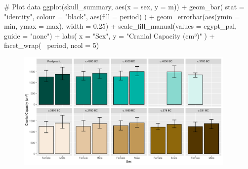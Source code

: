 \begin{inRhigh}[highlightlines={14}]
# Plot data
ggplot(skull_summary, aes(x = sex, y = m)) +
  geom_bar(
    stat = "identity",
    colour = "black",
    aes(fill = period)
  ) +
  geom_errorbar(aes(ymin = min, ymax = max), width = 0.25) +
  scale_fill_manual(values = egypt_pal, guide = "none") +
  labs(
    x = "Sex",
    y = "Cranial Capacity (cm³)"
  ) +
  facet_wrap(~ period, ncol = 5)
\end{inRhigh}

\vspace{2em}

\begin{figure}[H]
\includegraphics[width = 0.95\textwidth]{graphics/ch3Figs/bar_9.pdf}
\end{figure}
